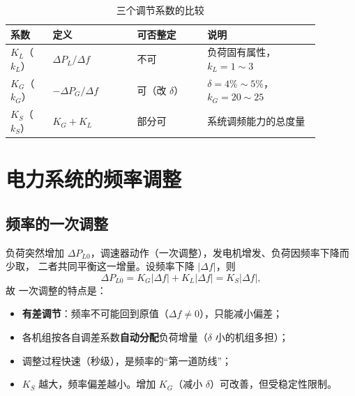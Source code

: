 \begin{table}[htbp]
  \centering
  \caption{三个调节系数的比较}
  \small
  \begin{tabular}{@{}p{0.12\linewidth}p{0.24\linewidth}p{0.20\linewidth}p{0.32\linewidth}@{}}
    \toprule
    系数 & 定义 & 可否整定 & 说明 \\
    \midrule
    $K_L$（$k_L$） & $\Delta P_L/\Delta f$ & 不可 & 负荷固有属性，$k_L=1\sim3$ \\
    $K_G$（$k_G$） & $-\Delta P_G/\Delta f$ & 可（改 $\delta$） & $\delta=4\%\sim5\%$，$k_G=20\sim25$ \\
    $K_S$（$k_S$） & $K_G+K_L$ & 部分可 & 系统调频能力的总度量 \\
    \bottomrule
  \end{tabular}
\end{table}


\section{电力系统的频率调整}

\subsection{频率的一次调整}

负荷突然增加 $\Delta P_{L0}$，调速器动作（一次调整），发电机增发、负荷因频率下降而少取，
二者共同平衡这一增量。设频率下降 $|\Delta f|$，则
\begin{equation}
  \Delta P_{L0}=K_G\left|\Delta f\right|+K_L\left|\Delta f\right|=K_S\left|\Delta f\right|,
\end{equation}
故
一次调整的特点是：
\begin{itemize}
  \item \textbf{有差调节}：频率不可能回到原值（$\Delta f\ne0$），只能减小偏差；
  \item 各机组按各自调差系数\textbf{自动分配}负荷增量（$\delta$ 小的机组多担）；
  \item 调整过程快速（秒级），是频率的“第一道防线”；
  \item $K_S$ 越大，频率偏差越小。增加 $K_G$（减小 $\delta$）可改善，但受稳定性限制。
\end{itemize}

